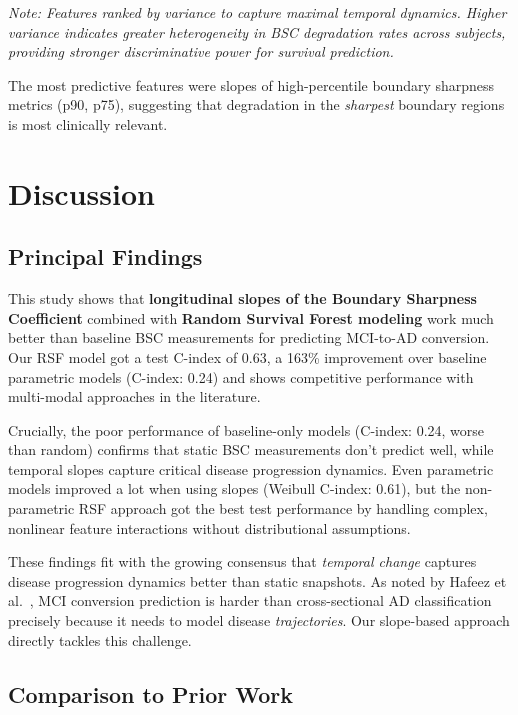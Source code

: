 \documentclass[blue]{ludusofficial}  %
\begin{document}
\textit{Note: Features ranked by variance to capture maximal temporal dynamics. Higher variance indicates greater heterogeneity in BSC degradation rates across subjects, providing stronger discriminative power for survival prediction.}

The most predictive features were slopes of high-percentile boundary sharpness metrics (p90, p75), suggesting that degradation in the \textit{sharpest} boundary regions is most clinically relevant.


\section{Discussion}

\subsection{Principal Findings}

This study shows that \textbf{longitudinal slopes of the Boundary Sharpness Coefficient} combined with \textbf{Random Survival Forest modeling} work much better than baseline BSC measurements for predicting MCI-to-AD conversion. Our RSF model got a test C-index of 0.63, a 163\% improvement over baseline parametric models (C-index: 0.24) and shows competitive performance with multi-modal approaches in the literature.

Crucially, the poor performance of baseline-only models (C-index: 0.24, worse than random) confirms that static BSC measurements don't predict well, while temporal slopes capture critical disease progression dynamics. Even parametric models improved a lot when using slopes (Weibull C-index: 0.61), but the non-parametric RSF approach got the best test performance by handling complex, nonlinear feature interactions without distributional assumptions.

These findings fit with the growing consensus that \textit{temporal change} captures disease progression dynamics better than static snapshots. As noted by Hafeez et al.~\cite{hafeez2024deep}, MCI conversion prediction is harder than cross-sectional AD classification precisely because it needs to model disease \textit{trajectories}. Our slope-based approach directly tackles this challenge.

\subsection{Comparison to Prior Work}
\end{document}
